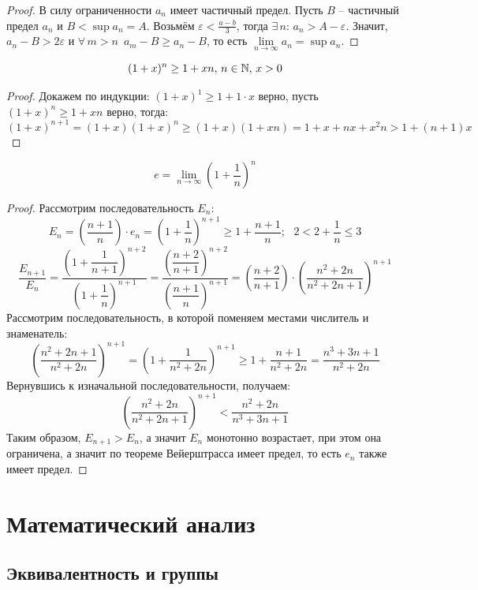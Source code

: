 \documentclass[12pt]{article}
\begin{document}
\begin{proof}
    В силу ограниченности $a_n$ имеет частичный предел. Пусть $B$ -- частичный предел $a_n$ и $B<\sup a_n=A$. Возьмём $\varepsilon<\frac{a-b}{3}$, тогда $\exists\,n:\,a_n>A-\varepsilon$. Значит, $a_n-B>2\varepsilon$ и $\forall\,m>n\enspace a_m-B\geq a_n-B$, то есть $\lim\limits_{n\to\infty}a_n=\sup a_n$.
\end{proof}
\begin{lemma}
    $$(1+x)^n\geq 1+xn,\,n\in \mathbb{N},\,x>0$$
\end{lemma}
\begin{proof}
    Докажем по индукции: $(1+x)^1\geq 1+1\cdot x$ верно, пусть $(1+x)^n\geq 1+xn$ верно, тогда:
    $$(1+x)^{n+1}=(1+x)(1+x)^n\geq (1+x)(1+xn)=1+x+nx+x^2n>1+(n+1)x$$
\end{proof}
\begin{definition}
    $$e=\lim_{n\to \infty}\left(1+\dfrac{1}{n}\right)^n$$
\end{definition}
\begin{proof}
    Рассмотрим последовательность $E_n$:
    $$E_n=\left(\dfrac{n+1}{n}\right)\cdot e_n=\left(1+\dfrac{1}{n}\right)^{n+1}\geq 1+\dfrac{n+1}{n};\enspace \,2<2+\frac{1}{n}\leq3$$
    $$\dfrac{E_{n+1}}{E_n}=\dfrac{\left(1+\dfrac{1}{n+1}\right)^{n+2}}{\left(1+\dfrac{1}{n}\right)^{n+1}}=\dfrac{\left(\dfrac{n+2}{n+1}\right)^{n+2}}{\left(\dfrac{n+1}{n}\right)^{n+1}}=\left(\dfrac{n+2}{n+1}\right)\cdot\left(\dfrac{n^2+2n}{n^2+2n+1}\right)^{n+1}$$
    Рассмотрим последовательность, в которой поменяем местами числитель и знаменатель:
    $$\left(\dfrac{n^2+2n+1}{n^2+2n}\right)^{n+1}=\left(1+\dfrac{1}{n^2+2n}\right)^{n+1}\geq1+\dfrac{n+1}{n^2+2n}=\dfrac{n^3+3n+1}{n^2+2n}$$
    Вернувшись к изначальной последовательности, получаем:
    $$\left(\dfrac{n^2+2n}{n^2+2n+1}\right)^{n+1}<\dfrac{n^2+2n}{n^3+3n+1}$$
    Таким образом, $E_{n+1}>E_n$, а значит $E_n$ монотонно возрастает, при этом она ограничена, а значит по теореме Вейерштрасса имеет предел, то есть $e_n$ также имеет предел.
\end{proof}

\section{Математический анализ}

\subsection{Эквивалентность и группы}
\end{document}
